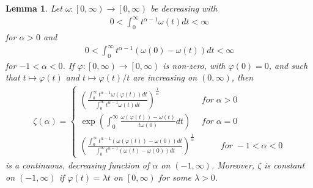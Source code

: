 \documentclass[preprint,12pt]{elsarticle}
\newtheorem{lem}{Lemma}
\begin{document}
\begin{lem}\cite[Lemma 17]{JM22}\label{7bb}
Let $\omega:\left [ 0,\infty  \right )\to \left [ 0,\infty  \right ) $ be decreasing with
\begin{eqnarray}
0<\int_{0}^{\infty }t^{\alpha -1 }\omega \left ( t \right ) dt < \infty 
\end{eqnarray}
for $\alpha >0$ and 
\begin{eqnarray}
0<\int_{0}^{\infty }t^{\alpha -1 }\left ( \omega \left ( 0 \right )- \omega \left ( t \right ) \right )  dt < \infty
\end{eqnarray}
for $-1<\alpha  <0$. If $\varphi:\left [ 0,\infty  \right )\to \left [ 0,\infty  \right )$ is non-zero, with $\varphi \left ( 0 \right )  =0$, and such that $t\longmapsto \varphi \left ( t \right )$ and $t\longmapsto \varphi \left ( t \right )/t $ are increasing on $(0,\infty)$, then
\begin{eqnarray}
\zeta  \left ( \alpha  \right )=\left\{\begin{matrix}
\left ( \frac{\int_{0}^{\infty }t^{\alpha-1 }\omega \left ( \varphi \left ( t \right )  \right )dt   }{\int_{0}^{\infty }t^{\alpha-1 }\omega\left (t  \right )    dt   }  \right )^{\frac{1}{\alpha } }
& for\; \alpha >0\\\exp \left ( \int_{0}^{\infty}\frac{\omega \left ( \varphi \left ( t \right )  \right )-\omega \left ( t \right )  }{t\omega\left ( 0 \right ) } dt  \right ) &for \; \alpha=0\\
\left ( \frac{\int_{0}^{\infty }t^{\alpha-1 }\left ( \omega \left ( \varphi \left ( t \right )  \right )-\omega \left ( 0 \right ) \right )  dt   }{\int_{0}^{\infty }t^{\alpha-1 }\left ( \omega\left (t  \right )-\omega \left ( 0 \right )  \right )     dt   }  \right )^{\frac{1}{\alpha } } &\;\;\;\;\;\;\;\;for\;-1<\alpha <0
\end{matrix}\right.\nonumber
\end{eqnarray}
is a continuous, decreasing function of $\alpha$ on $(-1,\infty)$. Moreover, $\zeta$ is constant on $(-1,\infty)$ if $\varphi \left ( t \right ) =\lambda t$ on $\left [ 0,\infty \right )$ for some $\lambda>0$.  
\end{lem}
\end{document}
